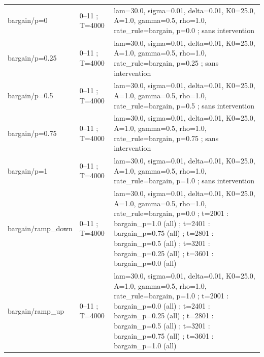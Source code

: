 {\begin{longtable}{@{}p{.27\linewidth}p{.14\linewidth}p{.53\linewidth}@{}}
bargain/\allowbreak{}p=0 & 0--11 ; T=4000 & lam=30.0,\allowbreak{}  sigma=0.01,\allowbreak{}  delta=0.01,\allowbreak{}  K0=25.0,\allowbreak{}  A=1.0,\allowbreak{}  gamma=0.5,\allowbreak{}  rho=1.0,\allowbreak{}  rate\_\allowbreak{}rule=bargain,\allowbreak{}  p=0.0 ; sans intervention \\
bargain/\allowbreak{}p=0.25 & 0--11 ; T=4000 & lam=30.0,\allowbreak{}  sigma=0.01,\allowbreak{}  delta=0.01,\allowbreak{}  K0=25.0,\allowbreak{}  A=1.0,\allowbreak{}  gamma=0.5,\allowbreak{}  rho=1.0,\allowbreak{}  rate\_\allowbreak{}rule=bargain,\allowbreak{}  p=0.25 ; sans intervention \\
bargain/\allowbreak{}p=0.5 & 0--11 ; T=4000 & lam=30.0,\allowbreak{}  sigma=0.01,\allowbreak{}  delta=0.01,\allowbreak{}  K0=25.0,\allowbreak{}  A=1.0,\allowbreak{}  gamma=0.5,\allowbreak{}  rho=1.0,\allowbreak{}  rate\_\allowbreak{}rule=bargain,\allowbreak{}  p=0.5 ; sans intervention \\
bargain/\allowbreak{}p=0.75 & 0--11 ; T=4000 & lam=30.0,\allowbreak{}  sigma=0.01,\allowbreak{}  delta=0.01,\allowbreak{}  K0=25.0,\allowbreak{}  A=1.0,\allowbreak{}  gamma=0.5,\allowbreak{}  rho=1.0,\allowbreak{}  rate\_\allowbreak{}rule=bargain,\allowbreak{}  p=0.75 ; sans intervention \\
bargain/\allowbreak{}p=1 & 0--11 ; T=4000 & lam=30.0,\allowbreak{}  sigma=0.01,\allowbreak{}  delta=0.01,\allowbreak{}  K0=25.0,\allowbreak{}  A=1.0,\allowbreak{}  gamma=0.5,\allowbreak{}  rho=1.0,\allowbreak{}  rate\_\allowbreak{}rule=bargain,\allowbreak{}  p=1.0 ; sans intervention \\
bargain/\allowbreak{}ramp\_\allowbreak{}down & 0--11 ; T=4000 & lam=30.0,\allowbreak{}  sigma=0.01,\allowbreak{}  delta=0.01,\allowbreak{}  K0=25.0,\allowbreak{}  A=1.0,\allowbreak{}  gamma=0.5,\allowbreak{}  rho=1.0,\allowbreak{}  rate\_\allowbreak{}rule=bargain,\allowbreak{}  p=0.0 ; t=2001 : bargain\_\allowbreak{}p=1.0 (all) ; t=2401 : bargain\_\allowbreak{}p=0.75 (all) ; t=2801 : bargain\_\allowbreak{}p=0.5 (all) ; t=3201 : bargain\_\allowbreak{}p=0.25 (all) ; t=3601 : bargain\_\allowbreak{}p=0.0 (all) \\
bargain/\allowbreak{}ramp\_\allowbreak{}up & 0--11 ; T=4000 & lam=30.0,\allowbreak{}  sigma=0.01,\allowbreak{}  delta=0.01,\allowbreak{}  K0=25.0,\allowbreak{}  A=1.0,\allowbreak{}  gamma=0.5,\allowbreak{}  rho=1.0,\allowbreak{}  rate\_\allowbreak{}rule=bargain,\allowbreak{}  p=1.0 ; t=2001 : bargain\_\allowbreak{}p=0.0 (all) ; t=2401 : bargain\_\allowbreak{}p=0.25 (all) ; t=2801 : bargain\_\allowbreak{}p=0.5 (all) ; t=3201 : bargain\_\allowbreak{}p=0.75 (all) ; t=3601 : bargain\_\allowbreak{}p=1.0 (all) \\

\end{longtable}}
